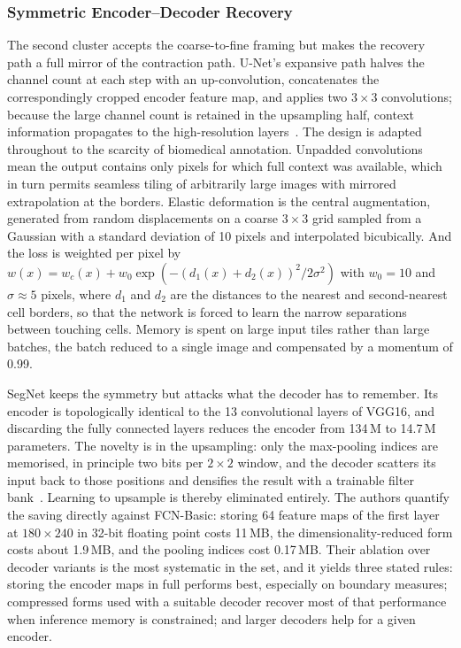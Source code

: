 \documentclass[journal]{IEEEtran}
\begin{document}
\subsubsection{Symmetric Encoder--Decoder Recovery}
The second cluster accepts the coarse-to-fine framing but makes the recovery path a
full mirror of the contraction path. U-Net's expansive path halves the channel count
at each step with an up-convolution, concatenates the correspondingly cropped
encoder feature map, and applies two $3\times3$ convolutions; because the large
channel count is retained in the upsampling half, context information propagates to
the high-resolution layers~\cite{ronneberger2015unet}. The design is adapted
throughout to the scarcity of biomedical annotation. Unpadded convolutions mean the
output contains only pixels for which full context was available, which in turn
permits seamless tiling of arbitrarily large images with mirrored extrapolation at the
borders. Elastic deformation is the central augmentation, generated from random
displacements on a coarse $3\times3$ grid sampled from a Gaussian with a standard
deviation of 10 pixels and interpolated bicubically. And the loss is weighted per
pixel by $w(x)=w_c(x)+w_0\exp(-(d_1(x)+d_2(x))^2/2\sigma^2)$ with $w_0=10$ and
$\sigma\approx5$ pixels, where $d_1$ and $d_2$ are the distances to the nearest and
second-nearest cell borders, so that the network is forced to learn the narrow
separations between touching cells. Memory is spent on large input tiles rather than
large batches, the batch reduced to a single image and compensated by a momentum of
0.99.

SegNet keeps the symmetry but attacks what the decoder has to remember. Its encoder is
topologically identical to the 13 convolutional layers of VGG16, and discarding the
fully connected layers reduces the encoder from 134\,M to 14.7\,M parameters. The
novelty is in the upsampling: only the max-pooling indices are memorised, in principle
two bits per $2\times2$ window, and the decoder scatters its input back to those
positions and densifies the result with a trainable filter
bank~\cite{badrinarayanan2015segnet}. Learning to upsample is thereby eliminated
entirely. The authors quantify the saving directly against FCN-Basic: storing 64
feature maps of the first layer at $180\times240$ in 32-bit floating point costs
11\,MB, the dimensionality-reduced form costs about 1.9\,MB, and the pooling indices
cost 0.17\,MB. Their ablation over decoder variants is the most systematic in the set,
and it yields three stated rules: storing the encoder maps in full performs best,
especially on boundary measures; compressed forms used with a suitable decoder
recover most of that performance when inference memory is constrained; and larger
decoders help for a given encoder.
\end{document}

